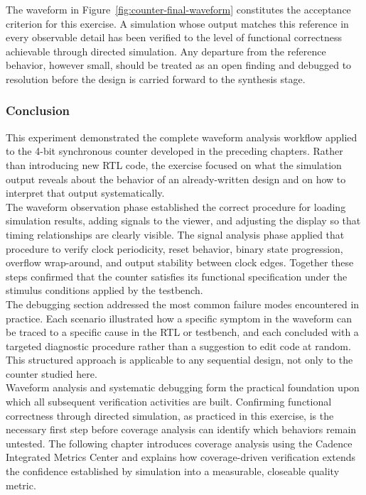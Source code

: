 The waveform in Figure~\ref{fig:counter-final-waveform} constitutes the
acceptance criterion for this exercise. A simulation whose output matches
this reference in every observable detail has been verified to the level
of functional correctness achievable through directed simulation. Any
departure from the reference behavior, however small, should be treated as
an open finding and debugged to resolution before the design is carried
forward to the synthesis stage.

\subsubsection{Conclusion}
\label{sec:sim-lab-conclusion}

This experiment demonstrated the complete waveform analysis workflow applied
to the 4-bit synchronous counter developed in the preceding chapters. Rather
than introducing new RTL code, the exercise focused on what the simulation
output reveals about the behavior of an already-written design and on how
to interpret that output systematically.\\

The waveform observation phase established the correct procedure for loading
simulation results, adding signals to the viewer, and adjusting the display
so that timing relationships are clearly visible. The signal analysis phase
applied that procedure to verify clock periodicity, reset behavior, binary
state progression, overflow wrap-around, and output stability between clock
edges. Together these steps confirmed that the counter satisfies its
functional specification under the stimulus conditions applied by the
testbench.\\

The debugging section addressed the most common failure modes encountered
in practice. Each scenario illustrated how a specific symptom in the
waveform can be traced to a specific cause in the RTL or testbench, and
each concluded with a targeted diagnostic procedure rather than a
suggestion to edit code at random. This structured approach is applicable
to any sequential design, not only to the counter studied here.\\

Waveform analysis and systematic debugging form the practical foundation
upon which all subsequent verification activities are built. Confirming
functional correctness through directed simulation, as practiced in this
exercise, is the necessary first step before coverage analysis can identify
which behaviors remain untested. The following chapter introduces coverage
analysis using the Cadence Integrated Metrics Center and explains how
coverage-driven verification extends the confidence established by
simulation into a measurable, closeable quality metric.\\
